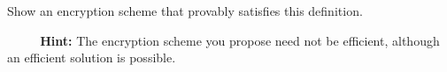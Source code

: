 \begin{questions}
\begin{parts}
            Show an encryption scheme that provably satisfies this definition.

            \par $\text{ }\text{ }\text{ }\text{ }$\textbf{Hint:} The encryption scheme you propose need not be efficient, although an efficient solution is possible.

            \begin{solution}
            \end{solution}

        \end{parts}

\end{questions}



